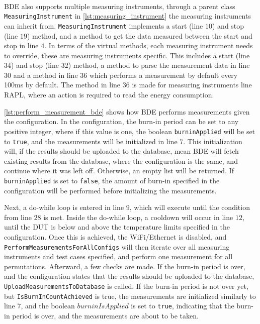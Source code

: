 

\paragraph*{}
BDE also supports multiple measuring instruments, through a parent class \texttt{MeasuringInstrument} in \cref{lst:measuring_instrument} the measuring instruments can inherit from. \texttt{MeasuringInstrument} implements a start (line $10$) and stop (line $19$) method, and a method to get the data measured between the start and stop in line $4$. In terms of the virtual methods, each measuring instrument needs to override, these are measuring instruments specific. This includes a start (line $34$) and stop (line $32$) method, a method to parse the measurement data in line $30$ and a method in line $36$ which performs a measurement by default every 100ms by default. The method in line $36$ is made for measuring instruments line RAPL, where an action is required to read the energy consumption.
\newpage



\cref{lst:perform_measurement_bde} shows how BDE performs measurements given the configuration. In the configuration, the burn-in period can be set to any positive integer, where if this value is one, the boolean \texttt{burninApplied} will be set to \texttt{true}, and the measurements will be initialized in line $7$. This initialization will, if the results should be uploaded to the database, mean BDE will fetch existing results from the database, where the configuration is the same, and continue where it was left off. Otherwise, an empty list will be returned. If \texttt{burninApplied} is set to \texttt{false}, the amount of burn-in specified in the configuration will be performed before initializing the measurements.

Next, a do-while loop is entered in line $9$, which will execute until the condition  from line $28$ is met. Inside the do-while loop, a cooldown will occur in line $12$, until the DUT is below and above the temperature limits specified in the configuration. Once this is achieved, the WiFi/Ethernet is disabled, and \texttt{PerformMeasurementsForAllConfigs} will then iterate over all measuring instruments and test cases specified, and perform one measurement for all permutations. Afterward, a few checks are made. If the burn-in period is over, and the configuration states that the results should be uploaded to the database, \texttt{UploadMeasurementsToDatabase} is called. If the burn-in period is not over yet, but \texttt{IsBurnInCountAchieved} is true, the measurements are initialized similarly to line $7$, and the boolean $burninIsApplied$ is set to \texttt{true}, indicating that the burn-in period is over, and the measurements are about to be taken. 
